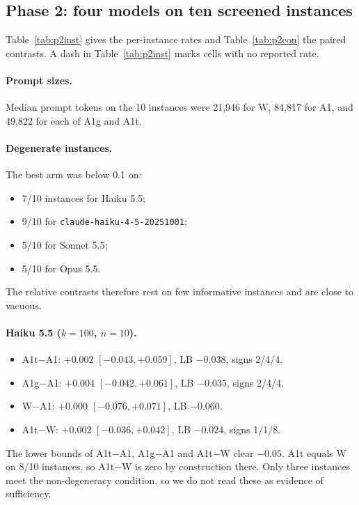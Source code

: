 \subsection{Phase 2: four models on ten screened instances}

Table~\ref{tab:p2inst} gives the per-instance rates and Table~\ref{tab:p2con} the paired contrasts. A dash in Table~\ref{tab:p2inst} marks cells with no reported rate.

\paragraph{Prompt sizes.} Median prompt tokens on the 10 instances were 21,946 for W, 84,817 for A1, and 49,822 for each of A1g and A1t.

\paragraph{Degenerate instances.} The best arm was below 0.1 on:
\begin{itemize}
\item 7/10 instances for Haiku 5.5;
\item 9/10 for \texttt{claude-haiku-4-5-20251001};
\item 5/10 for Sonnet 5.5;
\item 5/10 for Opus 5.5.
\end{itemize}
The relative contrasts therefore rest on few informative instances and are close to vacuous.

\paragraph{Haiku 5.5 ($k=100$, $n=10$).}
\begin{itemize}
\item A1t$-$A1: $+0.002$ $[-0.043, +0.059]$, LB $-0.038$, signs 2/4/4.
\item A1g$-$A1: $+0.004$ $[-0.042, +0.061]$, LB $-0.035$, signs 2/4/4.
\item W$-$A1: $+0.000$ $[-0.076, +0.071]$, LB $-0.060$.
\item A1t$-$W: $+0.002$ $[-0.036, +0.042]$, LB $-0.024$, signs 1/1/8.
\end{itemize}
The lower bounds of A1t$-$A1, A1g$-$A1 and A1t$-$W clear $-0.05$. A1t equals W on 8/10 instances, so A1t$-$W is zero by construction there. Only three instances meet the non-degeneracy condition, so we do not read these as evidence of sufficiency.

